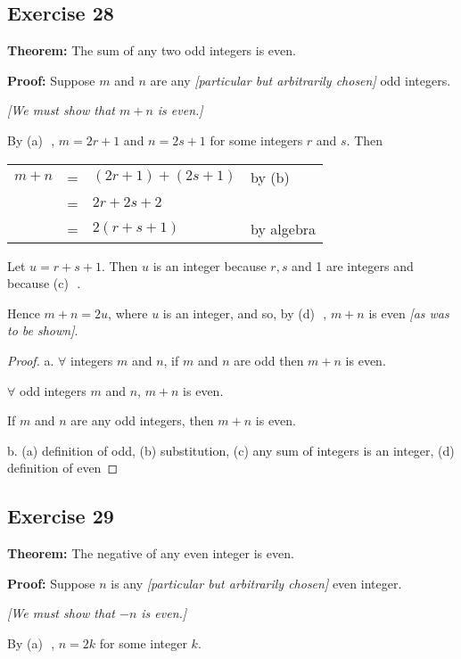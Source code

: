 \documentclass[14pt]{extarticle}
\newcommand{\fbl}{\underline{\hspace{1cm}}\,\,}
\newcommand{\fa}{\forall}
\newcommand{\cy}{\color{cyan}}
\begin{document}
\subsection{Exercise 28}
{\bf Theorem:} The sum of any two odd integers is even.

    {\bf Proof:} Suppose $m$ and $n$ are any {\it [particular but arbitrarily chosen]} odd integers.

    {\it [We must show that $m + n$ is even.]}

By {\cy (a)} \fbl, $m = 2r + 1$ and $n = 2s + 1$ for some integers $r$ and $s$. Then

\begin{center}
    \begin{tabular}{rcll}
        $m+n$ & = & $(2r+1) + (2s+1)$ & {\cy by (b)} \fbl \\
              & = & $2r + 2s + 2$     &                   \\
              & = & $2(r+s+1)$        & \cy by algebra    \\
    \end{tabular}
\end{center}

Let $u = r + s + 1$. Then $u$ is an integer because $r, s$ and 1 are integers and because {\cy (c)} \fbl.

Hence $m + n = 2u$, where $u$ is an integer, and so, by {\cy (d)} \fbl, $m + n$ is even {\it [as was to be shown]}.

\begin{proof}
    a. $\fa$ integers $m$ and $n$, if $m$ and $n$ are odd then $m + n$ is even.

    $\fa$ odd integers $m$ and $n$, $m + n$ is even.

    If $m$ and $n$ are any odd integers, then $m + n$ is even.

    b. (a) definition of odd, (b) substitution, (c) any sum of
    integers is an integer, (d) definition of even
\end{proof}

\subsection{Exercise 29}
{\bf Theorem:} The negative of any even integer is even.

    {\bf Proof:} Suppose $n$ is any {\it [particular but arbitrarily chosen]} even integer.

    {\it [We must show that $-n$ is even.]}

By {\cy (a)} \fbl, $n = 2k$ for some integer $k$.
\end{document}
